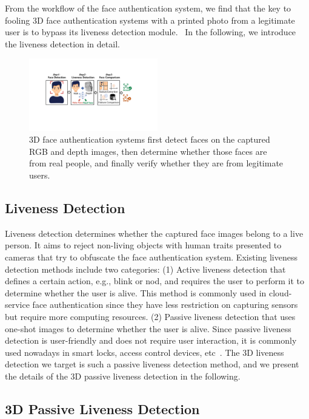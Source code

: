 From the workflow of the face authentication system, we find that the key to fooling 3D face authentication systems with a printed photo from a legitimate user is to bypass its liveness detection module.  In the following, we introduce the liveness detection in detail.

\begin{figure}[pt]
	\centerline{\includegraphics[width = 0.5\textwidth]{figures/face_auth_workflow.pdf}}
	\vspace{-0.15in}
	\caption{3D face authentication systems first detect faces on the captured RGB and depth images, then determine whether those faces are from real people, and finally verify whether they are from legitimate users. }
	\label{fas_workflow}
	\vspace{-0.15in}
\end{figure}

\subsection{Liveness Detection}
Liveness detection  determines
whether the captured face images belong to a live person. It aims to reject non-living objects with human traits presented to cameras that try to obfuscate the face authentication system. 
Existing liveness detection methods include two categories: (1) Active liveness detection that defines a certain action, e.g., blink or nod, and requires the user to perform it to determine whether the user is alive. This method is commonly used in cloud-service face authentication since they have less restriction on capturing sensors but require more computing resources. (2) Passive liveness detection that uses one-shot images to determine whether the user is alive. 
Since passive liveness detection is user-friendly and does not require user interaction, it is commonly used nowadays in smart locks, access control devices, etc~\cite{chakraborty2014overview}.  The 3D liveness detection we target is such a passive liveness detection method,  and we present the details of the 3D passive liveness detection in the following. 

\subsection{3D Passive Liveness Detection}

